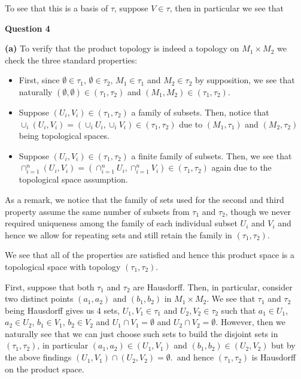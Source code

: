 \documentclass[10pt]{article}
\begin{document}
To see that this is a basis of $\tau$, suppose $V \in \tau$, then in particular we see that 

\newpage

\textbf{Question 4}

\textbf{(a)} To verify that the product topology is indeed a topology on $M_{1} \times M_{2}$ we check the three standard properties:

\begin{itemize}
\item First, since $\emptyset \in \tau_{1}$, $\emptyset \in \tau_{2}$, $M_{1}\in \tau_{1}$ and $M_{2}\in \tau_{2}$ by supposition, we see that naturally $(\emptyset,\emptyset)\in (\tau_{1},\tau_{2})$ and $(M_{1},M_{2}) \in (\tau_{1},\tau_{2})$.
\item Suppose $(U_{i},V_{i})\in (\tau_{1},\tau_{2})$ a family of subsets. Then, notice that $\cup_{i}(U_{i},V_{i}) = (\cup_{i}U_{i},\cup_{i}V_{i})\in (\tau_{1},\tau_{2})$ due to $(M_{1},\tau_{1})$ and $(M_{2},\tau_{2})$ being topological spaces.
\item Suppose $(U_{i},V_{i})\in (\tau_{1},\tau_{2})$ a finite family of subsets. Then, we see that $\cap_{i=1}^{n}(U_{i},V_{i}) = (\cap_{i=1}^{n}U_{i},\cap_{i=1}^{n}V_{i})\in (\tau_{1},\tau_{2})$ again due to the topological space assumption.
\end{itemize}

As a remark, we notice that the family of sets used for the second and third property assume the same number of subsets from $\tau_{1}$ and $\tau_{2}$, though we never required uniqueness among the family of each individual subset $U_{i}$ and $V_{i}$ and hence we allow for repeating sets and still retain the family in $(\tau_{1},\tau_{2})$.

We see that all of the properties are satisfied and hence this product space is a topological space with topology $(\tau_{1},\tau_{2})$. 

First, suppose that both $\tau_{1}$ and $\tau_{2}$ are Hausdorff. Then, in particular, consider two distinct points $(a_{1},a_{2})$ and $(b_{1},b_{2})$ in $M_{1} \times M_{2}$. We see that $\tau_{1}$ and $\tau_{2}$ being Hausdorff gives us 4 sets, $U_{1},V_{1} \in \tau_{1}$ and $U_{2},V_{2}\in \tau_{2}$ such that $a_{1}\in U_{1}$, $a_{2} \in U_{2}$, $b_{1} \in V_{1}$, $b_{2} \in V_{2}$ and $U_{1}\cap V_{1} = \emptyset$ and $U_{2}\cap V_{2} = \emptyset$. However, then we naturally see that we can just choose such sets to build the disjoint sets in $(\tau_{1},\tau_{2})$, in particular $(a_{1},a_{2}) \in (U_{1},V_{1})$ and $(b_{1},b_{2}) \in (U_{2}, V_{2})$ but by the above findings $(U_{1},V_{1}) \cap (U_{2}, V_{2}) = \emptyset$.\, and hence $(\tau_{1},\tau_{2})$ is Hausdorff on the product space.
\end{document}
